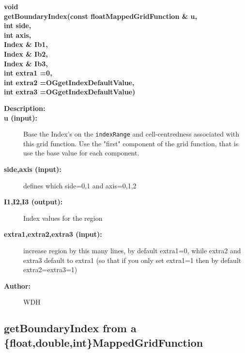 \begin{flushleft} \textbf{%
void  \\ 
\settowidth{\OGgetIndexIncludeArgIndent}{getBoundaryIndex(}%
getBoundaryIndex(const floatMappedGridFunction \& u, \\ 
\hspace{\OGgetIndexIncludeArgIndent}int side, \\ 
\hspace{\OGgetIndexIncludeArgIndent}int axis, \\ 
\hspace{\OGgetIndexIncludeArgIndent}Index \& Ib1, \\ 
\hspace{\OGgetIndexIncludeArgIndent}Index \& Ib2, \\ 
\hspace{\OGgetIndexIncludeArgIndent}Index \& Ib3, \\ 
\hspace{\OGgetIndexIncludeArgIndent}int extra1 =0,\\ 
\hspace{\OGgetIndexIncludeArgIndent}int extra2 =OGgetIndexDefaultValue,\\ 
\hspace{\OGgetIndexIncludeArgIndent}int extra3   =OGgetIndexDefaultValue)
}\end{flushleft}
\begin{description}
\item[{\bf Description:}] 
\item[{\bf u (input):}]  Base the Index's on the {\tt indexRange} and cell-centredness associated   
     with this grid function. Use the "first" component of the grid function, that is
     use the base value for each component.
\item[{\bf side,axis (input):}]  defines which side=0,1 and axis=0,1,2
\item[{\bf I1,I2,I3 (output):}]  Index values for the region
\item[{\bf extra1,extra2,extra3 (input):}]  increase region by this many lines, by default extra1=0, while 
                         extra2 and extra3 default to extra1 (so that if you only set extra1=1
                         then by default extra2=extra3=1)
\item[{\bf Author:}]  WDH
\end{description}
\subsection{getBoundaryIndex from a \{float,double,int\}MappedGridFunction}
 
